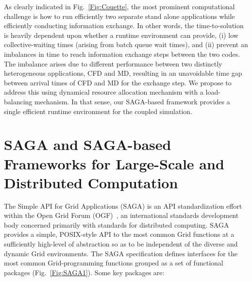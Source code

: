 \documentclass[conference,final]{IEEEtran}
\newcommand{\Nkimnote}[1]{ {\textcolor{green} { ***Nkim: #1 }}}
\newcommand{\Nkimnote}[1]{}
\begin{document}


As clearly indicated in Fig.~\ref{Fig:Couette}, the most prominent
computational challenge is how to run efficiently two separate stand
alone applications while efficiently conducting information exchange.
In other words, the time-to-solution is heavily dependent upon whether
a runtime environment can provide, (i) low collective-waiting times
(arising from batch queue wait times), and (ii) prevent an imbalances
in time to reach information exchange steps between the two codes. The
imbalance arises due to different performance between two distinctly
heterogeneous applications, CFD and MD, resulting in an unavoidable
time gap between arrival times of CFD and MD for the exchange step. We
propose to address this using dynamical resource allocation mechanism
with a load-balancing mechanism. In that sense, our SAGA-based
framework provides a single efficient runtime environment for the
coupled simulation.

\section{SAGA and SAGA-based Frameworks for Large-Scale and Distributed Computation}

The Simple API for Grid Applications (SAGA) is an API standardization
effort within the Open Grid Forum (OGF)~\cite{ogf_web}, an
international standards development body concerned primarily with
standards for distributed computing. SAGA provides a simple,
POSIX-style API to the most common Grid functions at a sufficiently
high-level of abstraction so as to be %
independent of the diverse and dynamic Grid environments. The SAGA
specification defines interfaces for the most common Grid-programming
functions grouped as a set of functional packages
(Fig.~\ref{Fig:SAGA1}). Some key packages are:
\end{document}
